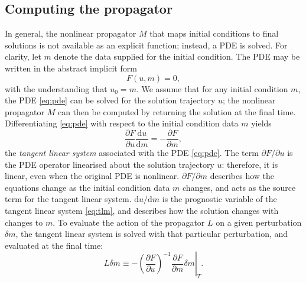 \documentclass{siamltex}
\begin{document}
\subsection{Computing the propagator}
In general, the nonlinear propagator $M$ that maps initial conditions to final solutions is not available as an explicit function;
instead, a PDE is solved. For clarity, let $m$ denote the data supplied for the initial condition. The PDE may be written in the abstract implicit
form
\begin{equation} \label{eq:pde}
F(u, m) = 0,
\end{equation}
with the understanding that $u_0 = m$. We assume that for any initial condition $m$, the PDE \eqref{eq:pde} can be solved for the solution trajectory $u$;
the nonlinear propagator $M$ can then be computed by returning the solution at the final time. Differentiating \eqref{eq:pde} with respect to the
initial condition data $m$ yields
\begin{equation} \label{eq:tlm}
  \frac{\partial F}{\partial u} \frac{\textrm{d}u}{\textrm{d}m} = - \frac{\partial F}{\partial m},
\end{equation}
the \emph{tangent linear system} associated with the PDE
\eqref{eq:pde}.  The term ${\partial F}/{\partial u}$ is the PDE
operator linearised about the solution trajectory $u$: therefore, it
is linear, even when the original PDE is nonlinear. ${\partial
  F}/{\partial m}$ describes how the equations change as the initial
condition data $m$ changes, and acts as the source term for the
tangent linear system. ${\textrm{d}u}/{\textrm{d}m}$ is the prognostic
variable of the tangent linear system \eqref{eq:tlm}, and describes
how the solution changes with changes to $m$. To evaluate the action
of the propagator $L$ on a given perturbation $\delta m$, the tangent
linear system is solved with that particular perturbation, and
evaluated at the final time:
\begin{equation}
L \delta m \equiv - \left.\left(\frac{\partial F}{\partial u}\right)^{-1}\frac{\partial F}{\partial m} \delta m\right|_T.
\end{equation}
\end{document}

